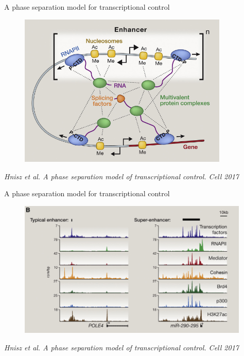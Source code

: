 \documentclass{beamer}					%
\begin{document}
\begin{frame}{A phase separation model for transcriptional control}
\begin{figure}
\includegraphics[width=10cm]{Super1.png}
\end{figure}
\textit{Hnisz et al. A phase separation model of transcriptional control. Cell 2017}
\end{frame}

\begin{frame}{A phase separation model for transcriptional control}
\begin{figure}
\includegraphics[width=11cm]{Super2.png}
\end{figure}
\textit{Hnisz et al. A phase separation model of transcriptional control. Cell 2017}
\end{frame}
\end{document}

